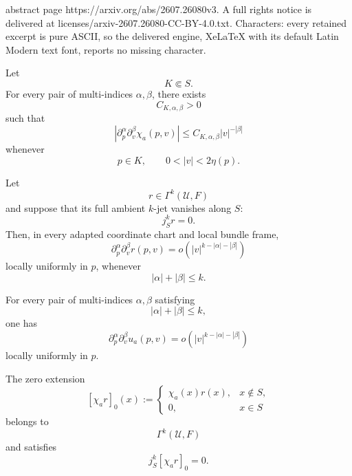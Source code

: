 \documentclass[10pt,a4paper]{amsart}
\begin{document}
abstract page https://arxiv.org/abs/2607.26080v3. A full rights notice is delivered at licenses/arxiv-2607.26080-CC-BY-4.0.txt. Characters: every retained excerpt is pure ASCII, so the delivered engine, XeLaTeX with its default Latin Modern text font, reports no missing character.
\begin{lemma}
\label{lem:angular-cutoff-derivative-bounds}
Let
\[
  K\Subset S.
\]
For every pair of multi-indices \(\alpha,\beta\), there exists
\[
  C_{K,\alpha,\beta}>0
\]
such that
\[
  \boxed{
  \left|
    \partial_p^\alpha
    \partial_v^\beta
    \chi_a(p,v)
  \right|
  \leq
  C_{K,\alpha,\beta}
  |v|^{-|\beta|}
  }
\]
whenever
\[
  p\in K,
  \qquad
  0<|v|<2\eta(p).
\]
\end{lemma}

\begin{lemma}
\label{lem:normal-taylor-decay}
Let
\[
  r\in\Gamma^k(\mathcal U,F)
\]
and suppose that its full ambient \(k\)-jet vanishes along \(S\):
\[
  j_S^k r=0.
\]
Then, in every adapted coordinate chart and local bundle frame,
\[
  \boxed{
  \partial_p^\alpha
  \partial_v^\beta r(p,v)
  =
  o
  \left(
    |v|^{k-|\alpha|-|\beta|}
  \right)
  }
\]
locally uniformly in \(p\), whenever
\[
  |\alpha|+|\beta|\leq k.
\]
\end{lemma}

\begin{proposition}
\label{prop:quantitative-cutoff-flatness}
For every pair of multi-indices \(\alpha,\beta\) satisfying
\[
  |\alpha|+|\beta|\leq k,
\]
one has
\[
  \boxed{
  \partial_p^\alpha
  \partial_v^\beta u_a(p,v)
  =
  o
  \left(
    |v|^{k-|\alpha|-|\beta|}
  \right)
  }
\]
locally uniformly in \(p\).

The zero extension
\[
  [\chi_ar]_0(x)
  :=
  \begin{cases}
    \chi_a(x)r(x),&x\notin S,\\
    0,&x\in S
  \end{cases}
\]
belongs to
\[
  \Gamma^k(\mathcal U,F)
\]
and satisfies
\[
  j_S^k[\chi_ar]_0=0.
\]
\end{proposition}
\end{document}
